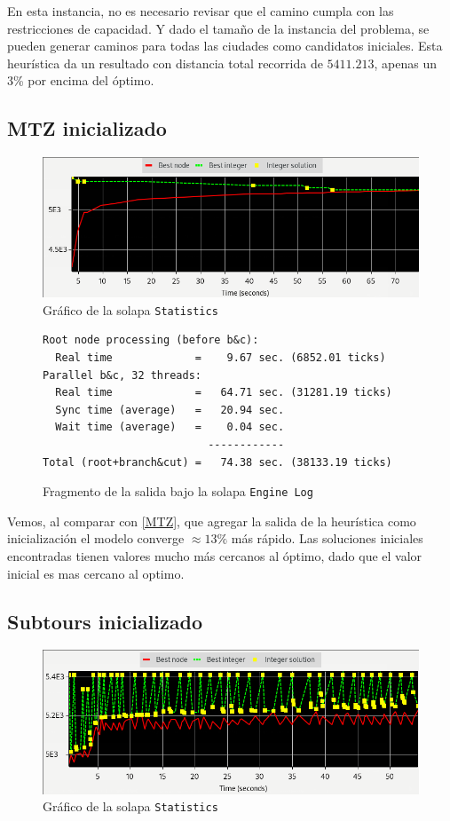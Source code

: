 \documentclass[titlepage,a4paper,oneside]{article}
\begin{document}
En esta instancia, no es necesario revisar que el camino cumpla con las restricciones de capacidad. Y dado el tamaño de la instancia del problema, se pueden generar caminos para todas las ciudades como candidatos iniciales. Esta heurística da un resultado con distancia total recorrida de $5411.213$, apenas un 3\% por encima del óptimo.

\subsection{MTZ inicializado}
\begin{figure}[H]
\centering
\includegraphics[width=\textwidth]{images/MTZ_init.png}
\caption{Gráfico de la solapa \texttt{Statistics}}
\end{figure}

\begin{figure}[H]
\begin{verbatim}
Root node processing (before b&c):
  Real time             =    9.67 sec. (6852.01 ticks)
Parallel b&c, 32 threads:
  Real time             =   64.71 sec. (31281.19 ticks)
  Sync time (average)   =   20.94 sec.
  Wait time (average)   =    0.04 sec.
                          ------------
Total (root+branch&cut) =   74.38 sec. (38133.19 ticks)
\end{verbatim}
\caption{Fragmento de la salida bajo la solapa \texttt{Engine Log}}
\end{figure}

Vemos, al comparar con \ref{MTZ}, que agregar la salida de la heurística como inicialización el modelo converge $\approx 13\%$ más rápido. Las soluciones iniciales encontradas tienen valores mucho más cercanos al óptimo, dado que el valor inicial es mas cercano al optimo.

\subsection{Subtours inicializado}
\begin{figure}[H]
\centering
\includegraphics[width=\textwidth]{images/subtours_init.png}
\caption{Gráfico de la solapa \texttt{Statistics}}
\end{figure}
\end{document}

